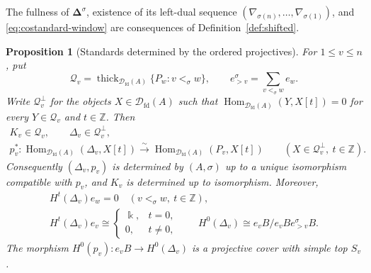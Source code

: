 \documentclass[11pt,a4paper]{article}
\newcommand{\D}{\mathcal D}
\newcommand{\ZZ}{\mathbb{Z}}
\newcommand{\std}{\Delta}
\newcommand{\costd}{\nabla}
\DeclareMathOperator{\fd}{fd}
\DeclareMathOperator{\Hom}{Hom}
\DeclareMathOperator{\thick}{thick}
\theoremstyle{plain}
\newtheorem{proposition}[theorem]{Proposition}
\theoremstyle{definition}
\numberwithin{equation}{section}
\begin{document}
The fullness of $\boldsymbol\std^\sigma$, existence of its left-dual
sequence $(\costd_{\sigma(n)},\ldots,\costd_{\sigma(1)})$, and
\eqref{eq:costandard-window} are consequences of
Definition~\ref{def:shifted}.

\begin{proposition}[Standards determined by the ordered projectives]
\label{prop:canonical}
For $1\leq v\leq n$, put
\begin{equation}\label{eq:tail}
 \mathcal Q_v=\thick_{\D_{\fd}(A)}\{P_w:v<_\sigma w\},\qquad
 e_{>v}^\sigma=\sum_{v<_\sigma w}e_w.
\end{equation}
Write $\mathcal Q_v^\perp$ for the objects $X\in\D_{\fd}(A)$ such that
$\Hom_{\D_{\fd}(A)}(Y,X[t])=0$ for every $Y\in\mathcal Q_v$ and
$t\in\ZZ$. Then
\begin{equation}\label{eq:localisation}
 \begin{gathered}
 K_v\in\mathcal Q_v,\qquad \std_v\in\mathcal Q_v^\perp,\\
 p_v^*:\Hom_{\D_{\fd}(A)}(\std_v,X[t])
 \xrightarrow{\sim}\Hom_{\D_{\fd}(A)}(P_v,X[t])
 \qquad(X\in\mathcal Q_v^\perp,\ t\in\ZZ).
 \end{gathered}
\end{equation}
Consequently $(\std_v,p_v)$ is determined by $(A,\sigma)$ up to a
unique isomorphism compatible with $p_v$, and $K_v$ is determined up to
isomorphism. Moreover,
\begin{equation}\label{eq:support}
 \begin{gathered}
 H^t(\std_v)e_w=0\quad(v<_\sigma w,\ t\in\ZZ),\\
 H^t(\std_v)e_v\cong
 \begin{cases}\Bbbk,&t=0,\\0,&t\neq0,
 \end{cases}
 \qquad
 H^0(\std_v)\cong e_vB/e_vBe_{>v}^\sigma B.
 \end{gathered}
\end{equation}
The morphism $H^0(p_v):e_vB\to H^0(\std_v)$ is a projective cover
with simple top $S_v$.
\end{proposition}
\end{document}
